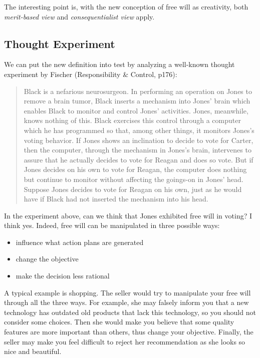 The interesting point is, with the new conception of free will as creativity, both \emph{merit-based view} and \emph{consequentialist view} apply.

\subsection{Thought Experiment}

We can put the new definition into test by analyzing a well-known thought experiment by Fischer (Responsibility \& Control, p176):

\begin{quote}
Black is a nefarious neurosurgeon. In performing an operation on Jones to remove a brain tumor, Black inserts a mechanism into Jones’ brain which enables Black to monitor and control Jones’ activities. Jones, meanwhile, knows nothing of this. Black exercises this control through a computer which he has programmed so that, among other things, it monitors Jones’s voting behavior. If Jones shows an inclination to decide to vote for Carter, then the computer, through the mechanism in Jones’s brain, intervenes to assure that he actually decides to vote for Reagan and does so vote. But if Jones decides on his own to vote for Reagan, the computer does nothing but continue to monitor without affecting the goings-on in Jones’ head. Suppose Jones decides to vote for Reagan on his own, just as he would have if Black had not inserted the mechanism into his head.
\end{quote}

In the experiment above, can we think that Jones exhibited free will in voting? I think yes. Indeed, free will can be manipulated in three possible ways:

\begin{itemize}
\item influence what action plans are generated
\item change the objective
\item make the decision less rational
\end{itemize}

A typical example is shopping. The seller would try to manipulate your free will through all the three ways. For example, she may falsely inform you that a new technology has outdated old products that lack this technology, so you should not consider some choices. Then she would make you believe that some quality features are more important than others, thus change your objective. Finally, the seller may make you feel difficult to reject her recommendation as she looks so nice and beautiful.

